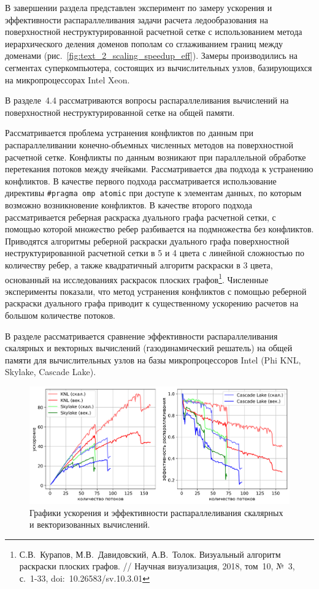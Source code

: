 \documentclass[a4paper,14pt]{extarticle}                     %
\theoremstyle{plain}                                         %
\begin{document}
В завершении раздела представлен эксперимент по замеру ускорения и эффективности распараллеливания задачи расчета ледообразования на поверхностной неструктурированной расчетной сетке с использованием метода иерархического деления доменов пополам со сглаживанием границ между доменами (рис.~\ref{fig:text_2_scaling_speedup_eff}).
Замеры производились на сегментах суперкомпьютера, состоящих из вычислительных узлов, базирующихся на микропроцессорах Intel Xeon.


В разделе~4.4 рассматриваются вопросы распараллеливания вычислений на поверхностной неструктурированной сетке на общей памяти.

Рассматривается проблема устранения конфликтов по данным при распараллеливании конечно-объемных численных методов на поверхностной расчетной сетке.
Конфликты по данным возникают при параллельной обработке перетекания потоков между ячейками.
Рассматривается два подхода к устранению конфликтов.
В качестве первого подхода рассматривается использование директивы \texttt{\#pragma omp atomic} при доступе к элементам данных, по которым возможно возникновение конфликтов.
В качестве второго подхода рассматривается реберная раскраска дуального графа расчетной сетки, с помощью которой множество ребер разбивается на подмножества без конфликтов.
Приводятся алгоритмы реберной раскраски дуального графа поверхностной неструктурированной расчетной сетки в 5 и 4 цвета с линейной сложностью по количеству ребер, а также квадратичный алгоритм раскраски в 3 цвета, основанный на исследованиях раскрасок плоских графов\footnote[4]{С.В.~Курапов, М.В.~Давидовский, А.В.~Толок. Визуальный алгоритм раскраски плоских графов. // Научная визуализация, 2018, том~10, №~3, с.~1-33, doi:~10.26583/sv.10.3.01}.
Численные эксперименты показали, что метод устранения конфликтов с помощью реберной раскраски дуального графа приводит к существенному ускорению расчетов на большом количестве потоков.

В разделе рассматривается сравнение эффективности распараллеливания скалярных и векторных вычислений (газодинамический решатель) на общей памяти для вычислительных узлов на базы микропроцессоров Intel (Phi KNL, Skylake, Cascade Lake).

\begin{figure}[ht]
\centering
\includegraphics[width=1.0\textwidth]{./fig/par_openmp_scalar_vec_chart_big.png}
\singlespacing
\caption{Графики ускорения и эффективности распараллеливания скалярных и векторизованных вычислений.}
\label{fig:text_3_omp2}
\end{figure}
\end{document}
